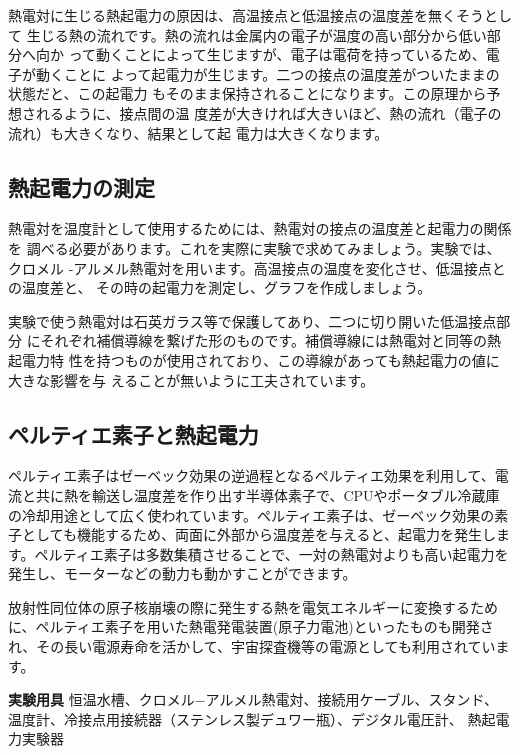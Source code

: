 熱電対に生じる熱起電力の原因は、高温接点と低温接点の温度差を無くそうとして 
生じる熱の流れです。熱の流れは金属内の電子が温度の高い部分から低い部分へ向か 
って動くことによって生じますが、電子は電荷を持っているため、電子が動くことに 
よって起電力が生じます。二つの接点の温度差がついたままの状態だと、この起電力 
もそのまま保持されることになります。この原理から予想されるように、接点間の温
度差が大きければ大きいほど、熱の流れ（電子の流れ）も大きくなり、結果として起 
電力は大きくなります。


\subsection{熱起電力の測定}

熱電対を温度計として使用するためには、熱電対の接点の温度差と起電力の関係を 
調べる必要があります。これを実際に実験で求めてみましょう。実験では、クロメル 
-アルメル熱電対を用います。高温接点の温度を変化させ、低温接点との温度差と、 
その時の起電力を測定し、グラフを作成しましょう。

実験で使う熱電対は石英ガラス等で保護してあり、二つに切り開いた低温接点部分 
にそれぞれ補償導線を繋げた形のものです。補償導線には熱電対と同等の熱起電力特 
性を持つものが使用されており、この導線があっても熱起電力の値に大きな影響を与 
えることが無いように工夫されています。

\subsection{ペルティエ素子と熱起電力}

ペルティエ素子はゼーベック効果の逆過程となるペルティエ効果を利用して、電流と共に熱を輸送し温度差を作り出す半導体素子で、CPUやポータブル冷蔵庫の冷却用途として広く使われています。ペルティエ素子は、ゼーベック効果の素子としても機能するため、両面に外部から温度差を与えると、起電力を発生します。ペルティエ素子は多数集積させることで、一対の熱電対よりも高い起電力を発生し、モーターなどの動力も動かすことができます。

放射性同位体の原子核崩壊の際に発生する熱を電気エネルギーに変換するために、ペルティエ素子を用いた熱電発電装置(原子力電池)といったものも開発され、その長い電源寿命を活かして、宇宙探査機等の電源としても利用されています。

\newpage

\jikken

\begin{itemsquarebox}[c]{\bf 実験用具}
恒温水槽、クロメル−アルメル熱電対、接続用ケーブル、スタンド、
温度計、冷接点用接続器（ステンレス製デュワー瓶）、デジタル電圧計、
熱起電力実験器
\end{itemsquarebox}

